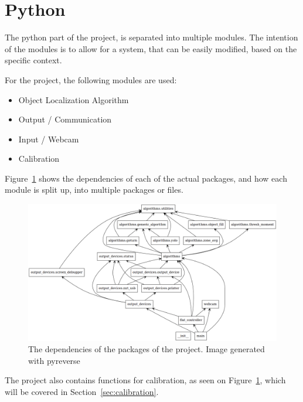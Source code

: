 \section{Python} \label{pythonstructure}
The python part of the project, is separated into multiple modules.
The intention of the modules is to allow for a system, that can be easily modified, based on the specific context.

For the project, the following modules are used:
\begin{itemize}
	\item Object Localization Algorithm
	\item Output / Communication
	\item Input / Webcam
	\item Calibration
\end{itemize}

Figure~\ref{fig:pythonClasses} shows the dependencies of each of the actual packages, and how each module is split up, into multiple packages or files.

\begin{figure}[H]
	\centering
	\includegraphics[width=\textwidth]{5.Solution/images/python_packages.png}
	\caption{The dependencies of the packages of the project{.} Image generated with pyreverse\cite{pyreverse}}
	\label{fig:pythonClasses}
\end{figure}


The project also contains functions for calibration, as seen on Figure~\ref{fig:pythonClasses}, which will be covered in Section~\ref{sec:calibration}.

